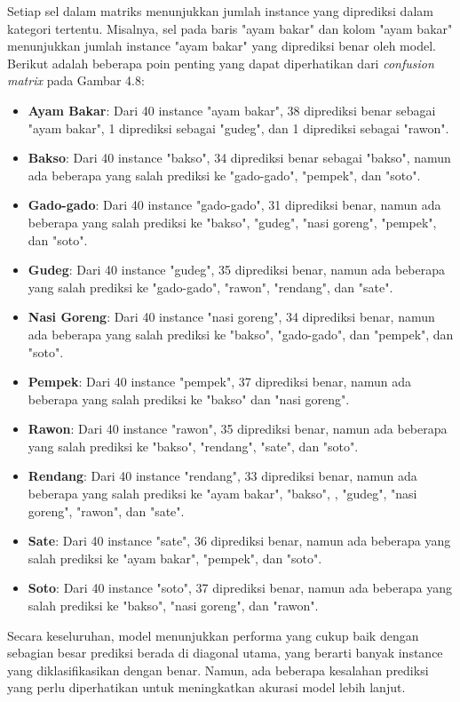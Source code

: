 Setiap sel dalam matriks menunjukkan jumlah instance yang diprediksi dalam kategori tertentu. Misalnya, sel pada baris "ayam bakar" dan kolom "ayam bakar" menunjukkan jumlah instance "ayam bakar" yang diprediksi benar oleh model. Berikut adalah beberapa poin penting yang dapat diperhatikan dari \textit{confusion matrix} pada Gambar 4.8:
\begin{itemize}
    \item \textbf{Ayam Bakar}: Dari 40 instance "ayam bakar", 38 diprediksi benar sebagai "ayam bakar", 1 diprediksi sebagai "gudeg", dan 1 diprediksi sebagai "rawon".
    \item \textbf{Bakso}: Dari 40 instance "bakso", 34 diprediksi benar sebagai "bakso", namun ada beberapa yang salah prediksi ke "gado-gado", "pempek", dan "soto".
    \item \textbf{Gado-gado}: Dari 40 instance "gado-gado", 31 diprediksi benar, namun ada beberapa yang salah prediksi ke "bakso", "gudeg", "nasi goreng", "pempek", dan "soto".
    \item \textbf{Gudeg}: Dari 40 instance "gudeg", 35 diprediksi benar, namun ada beberapa yang salah prediksi ke "gado-gado", "rawon", "rendang", dan "sate".
    \item \textbf{Nasi Goreng}: Dari 40 instance "nasi goreng", 34 diprediksi benar, namun ada beberapa yang salah prediksi ke "bakso", "gado-gado", dan "pempek", dan "soto".
    \item \textbf{Pempek}: Dari 40 instance "pempek", 37 diprediksi benar, namun ada beberapa yang salah prediksi ke "bakso" dan "nasi goreng".
    \item \textbf{Rawon}: Dari 40 instance "rawon", 35 diprediksi benar, namun ada beberapa yang salah prediksi ke "bakso", "rendang", "sate", dan "soto".
    \item \textbf{Rendang}: Dari 40 instance "rendang", 33 diprediksi benar, namun ada beberapa yang salah prediksi ke "ayam bakar", "bakso", , "gudeg", "nasi goreng", "rawon", dan "sate".
    \item \textbf{Sate}: Dari 40 instance "sate", 36 diprediksi benar, namun ada beberapa yang salah prediksi ke "ayam bakar", "pempek", dan "soto".
    \item \textbf{Soto}: Dari 40 instance "soto", 37 diprediksi benar, namun ada beberapa yang salah prediksi ke "bakso", "nasi goreng", dan "rawon".
\end{itemize}

Secara keseluruhan, model menunjukkan performa yang cukup baik dengan sebagian besar prediksi berada di diagonal utama, yang berarti banyak instance yang diklasifikasikan dengan benar. Namun, ada beberapa kesalahan prediksi yang perlu diperhatikan untuk meningkatkan akurasi model lebih lanjut.

